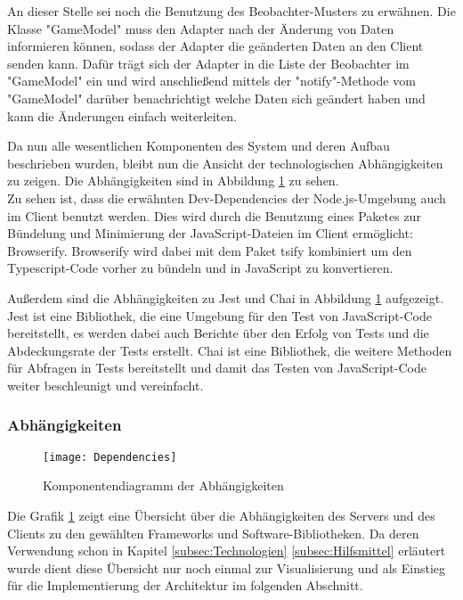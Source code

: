 An dieser Stelle sei noch die Benutzung des Beobachter-Musters zu erwähnen. Die Klasse "GameModel" muss den Adapter nach der Änderung von Daten informieren können, sodass der Adapter die geänderten Daten an den Client senden kann. Dafür trägt sich der Adapter in die Liste der Beobachter im "GameModel" ein und wird anschließend mittels der "notify"-Methode vom "GameModel" darüber benachrichtigt welche Daten sich geändert haben und kann die Änderungen einfach weiterleiten.

Da nun alle wesentlichen Komponenten des System und deren Aufbau beschrieben wurden, bleibt nun die Ansicht der technologischen Abhängigkeiten zu zeigen. Die Abhängigkeiten sind in Abbildung \ref{fig:ComponentDependencies} zu sehen.\\
Zu sehen ist, dass die erwähnten Dev-Dependencies der Node.js-Umgebung auch im Client benutzt werden. Dies wird durch die Benutzung eines Paketes zur Bündelung und Minimierung der JavaScript-Dateien im Client ermöglicht: Browserify. Browserify wird dabei mit dem Paket tsify kombiniert um den Typescript-Code vorher zu bündeln und in JavaScript zu konvertieren.

Außerdem sind die Abhängigkeiten zu Jest und Chai in Abbildung \ref{fig:ComponentDependencies} aufgezeigt. Jest ist eine Bibliothek, die eine Umgebung für den Test von JavaScript-Code bereitstellt, es werden dabei auch Berichte über den Erfolg von Tests und die Abdeckungsrate der Tests erstellt. Chai ist eine Bibliothek, die weitere Methoden für Abfragen in Tests bereitstellt und damit das Testen von JavaScript-Code weiter beschleunigt und vereinfacht.

\subsubsection{Abhängigkeiten}
\begin{figure}[htp]
	\centering
	\captionsetup{justification=centering}
	\texttt{[image: Dependencies]}
	\caption[Abhängigkeiten]{Komponentendiagramm der Abhängigkeiten}
	\label{fig:ComponentDependencies}
\end{figure}
\noindent Die Grafik \ref{fig:ComponentDependencies} zeigt eine Übersicht über die Abhängigkeiten des Servers und des Clients zu den gewählten Frameworks und Software-Bibliotheken. Da deren Verwendung schon in Kapitel \ref{subsec:Technologien} \bzw \ref{subsec:Hilfsmittel} erläutert wurde dient diese Übersicht nur noch einmal zur Visualisierung und als Einstieg für die Implementierung der Architektur im folgenden Abschnitt.

